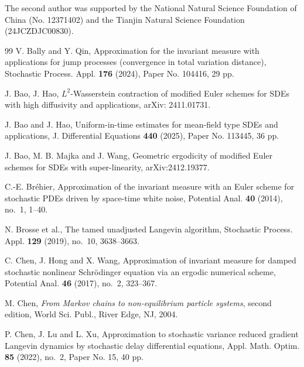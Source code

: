 \documentclass[aap]{imsart}
\theoremstyle{plain}
\theoremstyle{definition}
\begin{document}
			\begin{funding}
				The second author was supported by the  National Natural Science Foundation of China (No. 12371402) and the Tianjin Natural Science Foundation (24JCZDJC00830).
			\end{funding}
			\begin{thebibliography}{99}
				\label{IM1} V. Bally and Y. Qin, Approximation for the invariant measure with applications for jump processes (convergence in total variation distance), Stochastic Process. Appl. {\bf 176} (2024), Paper No. 104416, 29 pp.
				
				\label{Bao} J. Bao, J. Hao, $L^2$-Wasserstein contraction of modified Euler schemes for SDEs with high diffusivity and applications, arXiv: 2411.01731.
				
				\label{Bao1} J. Bao and J. Hao, Uniform-in-time estimates for mean-field type SDEs and applications, J. Differential Equations {\bf 440} (2025), Paper No. 113445, 36 pp.
				
				\label{Bao2} J. Bao, M. B. Majka and J. Wang, Geometric ergodicity of modified Euler schemes for SDEs with super-linearity, arXiv:2412.19377.
				
				
				\label{Brehier} C.-E. Br\'ehier, Approximation of the invariant measure with an Euler scheme for stochastic PDEs driven by space-time white noise, Potential Anal. {\bf 40} (2014), no.~1, 1--40.
				
				
				
				\label{Bro} N. Brosse et al., The tamed unadjusted Langevin algorithm, Stochastic Process. Appl. {\bf 129} (2019), no.~10, 3638--3663.

				
				\label{ChenC} C. Chen, J. Hong and X. Wang, Approximation of invariant measure for damped stochastic nonlinear Schr\"odinger equation via an ergodic numerical scheme, Potential Anal. {\bf 46} (2017), no.~2, 323--367.
				
				\label{Chen} M. Chen, {\it From Markov chains to non-equilibrium particle systems}, second edition, World Sci. Publ., River Edge, NJ, 2004.
				
				
				\label{AMO} P. Chen, J. Lu and L. Xu, Approximation to stochastic variance reduced gradient Langevin dynamics by stochastic delay differential equations, Appl. Math. Optim. {\bf 85} (2022), no.~2, Paper No. 15, 40 pp.
				

\end{thebibliography}
\end{document}
